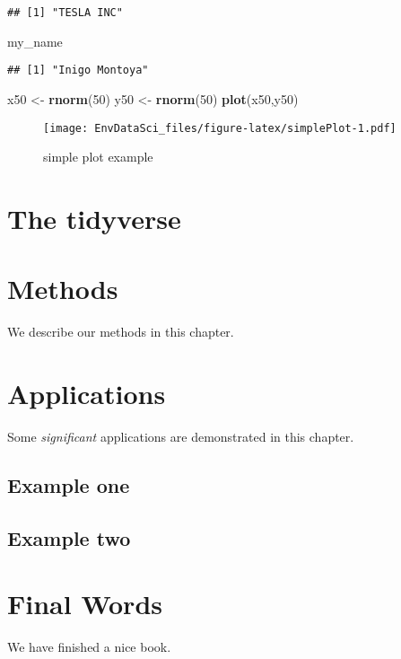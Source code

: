 \documentclass[
]{book}
\newenvironment{Shaded}{\begin{snugshade}}{\end{snugshade}}
\newcommand{\DecValTok}[1]{\textcolor[rgb]{0.00,0.00,0.81}{#1}}
\newcommand{\KeywordTok}[1]{\textcolor[rgb]{0.13,0.29,0.53}{\textbf{#1}}}
\newcommand{\NormalTok}[1]{#1}
\newcommand{\StringTok}[1]{\textcolor[rgb]{0.31,0.60,0.02}{#1}}
\begin{document}
\begin{verbatim}
## [1] "TESLA INC"
\end{verbatim}

\begin{Shaded}
\begin{Highlighting}[]
\NormalTok{my_name}
\end{Highlighting}
\end{Shaded}

\begin{verbatim}
## [1] "Inigo Montoya"
\end{verbatim}

\begin{Shaded}
\begin{Highlighting}[]
\NormalTok{x50 <-}\StringTok{ }\KeywordTok{rnorm}\NormalTok{(}\DecValTok{50}\NormalTok{)}
\NormalTok{y50 <-}\StringTok{ }\KeywordTok{rnorm}\NormalTok{(}\DecValTok{50}\NormalTok{)}
\KeywordTok{plot}\NormalTok{(x50,y50)}
\end{Highlighting}
\end{Shaded}

\begin{figure}
\centering
\texttt{[image: EnvDataSci\_files/figure-latex/simplePlot-1.pdf]}
\caption{\label{fig:simplePlot}simple plot example}
\end{figure}

\hypertarget{the-tidyverse}{%
\chapter{The tidyverse}\label{the-tidyverse}}

\hypertarget{methods}{%
\chapter{Methods}\label{methods}}

We describe our methods in this chapter.

\hypertarget{applications}{%
\chapter{Applications}\label{applications}}

Some \emph{significant} applications are demonstrated in this chapter.

\hypertarget{example-one}{%
\section{Example one}\label{example-one}}

\hypertarget{example-two}{%
\section{Example two}\label{example-two}}

\hypertarget{final-words}{%
\chapter{Final Words}\label{final-words}}

We have finished a nice book.

  
\end{document}
